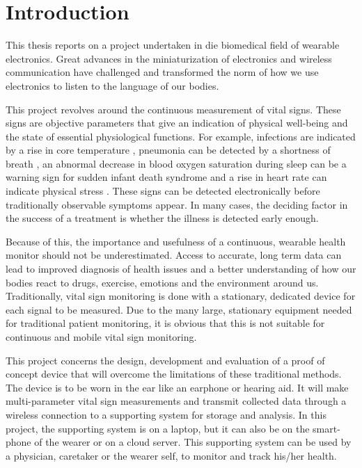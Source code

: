 \chapter{Introduction}
\label{chp:Introduction}
This thesis reports on a project undertaken in die biomedical field of wearable electronics. Great advances in the miniaturization of electronics and wireless communication have challenged and transformed the norm of how we use electronics to listen to the language of our bodies.

\medskip
This project revolves around the continuous measurement of vital signs. These signs are objective parameters that give an indication of physical well-being and the state of essential physiological functions. For example, infections are indicated by a rise in core temperature \citep{FluOrCold}, pneumonia can be detected by a shortness of breath \citep{MayoPneumonia}, an abnormal decrease in blood oxygen saturation during sleep can be a warning sign for sudden infant death syndrome \citep{thach2008tragic} and a rise in heart rate can indicate physical stress \citep{StressAndHR}. These signs can be detected electronically before traditionally observable symptoms appear. In many cases, the deciding factor in the success of a treatment is whether the illness is detected early enough.

\medskip
Because of this, the importance and usefulness of a continuous, wearable health monitor should not be underestimated. Access to accurate, long term data can lead to improved diagnosis of health issues and a better understanding of how our bodies react to drugs, exercise, emotions and the environment around us. Traditionally, vital sign monitoring is done with a stationary, dedicated device for each signal to be measured. Due to the many large, stationary equipment needed for traditional patient monitoring, it is obvious that this is not suitable for continuous and mobile vital sign monitoring.

\medskip
This project concerns the design, development and evaluation of a proof of concept device that will overcome the limitations of these traditional methods. The device is to be worn in the ear like an earphone or hearing aid. It will make multi-parameter vital sign measurements and transmit collected data through a wireless connection to a supporting system for storage and analysis. In this project, the supporting system is on a laptop, but it can also be on the smart-phone of the wearer or on a cloud server. This supporting system can be used by a physician, caretaker or the wearer self, to monitor and track his/her health.

